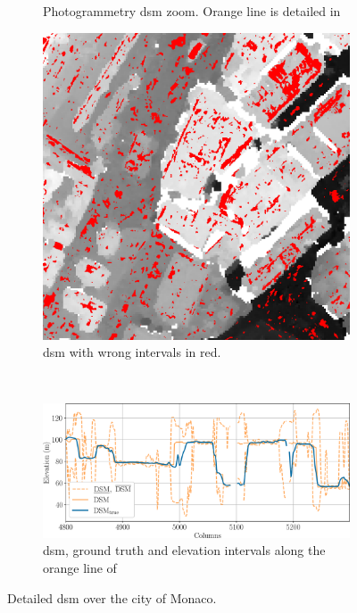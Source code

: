 \begin{figure}
\begin{subfigure}[t]{0.3\linewidth}
        \caption{Photogrammetry \acrshort{dsm} zoom. Orange line is detailed in }
        \label{fig:monaco_dsm_zoom}
    \end{subfigure}\hfill
    \begin{subfigure}[t]{0.3\linewidth}
        \flushright
        \includegraphics[width=0.83\linewidth]{Images/Chap_6/Monaco_error_zoom_6000-6500_4800-5300.png}
        \caption{\acrshort{dsm} with wrong intervals in red.}
        \label{fig:monaco_error_zoom}
    \end{subfigure}\\
    \begin{subfigure}[t]{\linewidth}
        \centering
        \includegraphics[width=\linewidth]{Images/Chap_6/Monaco_row_6250.png}
        \caption{\acrshort{dsm}, ground truth and elevation intervals along the orange line of }
        \label{fig:monaco_zoom_row}
    \end{subfigure}
    \caption{Detailed \acrshort{dsm} over the city of Monaco.}
    \label{fig:monaco_zoom}
\end{figure}


